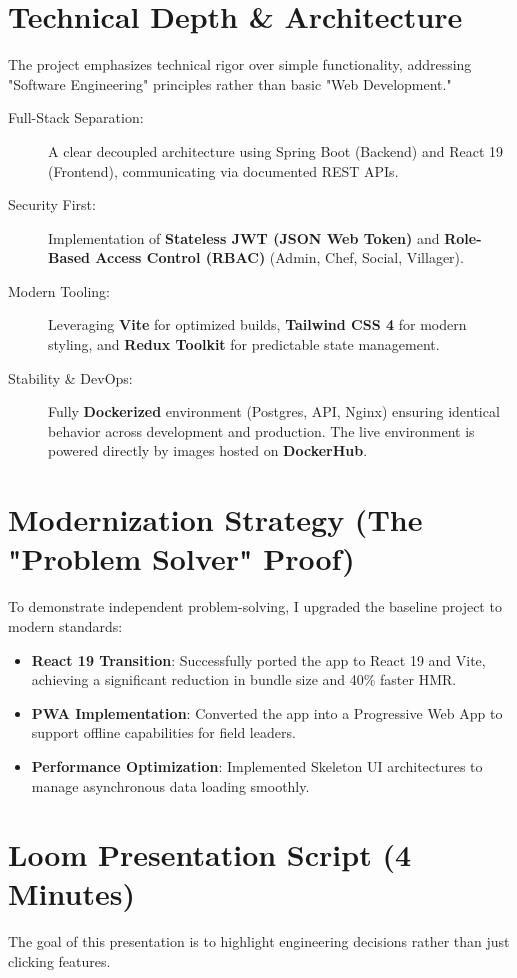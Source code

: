 \documentclass[11pt,a4paper]{article}
\begin{document}
\section{Technical Depth \& Architecture}
The project emphasizes technical rigor over simple functionality, addressing "Software Engineering" principles rather than basic "Web Development."

\begin{description}
    \item[Full-Stack Separation:] A clear decoupled architecture using Spring Boot (Backend) and React 19 (Frontend), communicating via documented REST APIs.
    \item[Security First:] Implementation of \textbf{Stateless JWT (JSON Web Token)} and \textbf{Role-Based Access Control (RBAC)} (Admin, Chef, Social, Villager).
    \item[Modern Tooling:] Leveraging \textbf{Vite} for optimized builds, \textbf{Tailwind CSS 4} for modern styling, and \textbf{Redux Toolkit} for predictable state management.
    \item[Stability \& DevOps:] Fully \textbf{Dockerized} environment (Postgres, API, Nginx) ensuring identical behavior across development and production. The live environment is powered directly by images hosted on \textbf{DockerHub}.
\end{description}

\section{Modernization Strategy (The "Problem Solver" Proof)}
To demonstrate independent problem-solving, I upgraded the baseline project to modern standards:
\begin{itemize}[noitemsep]
    \item \textbf{React 19 Transition}: Successfully ported the app to React 19 and Vite, achieving a significant reduction in bundle size and 40\% faster HMR.
    \item \textbf{PWA Implementation}: Converted the app into a Progressive Web App to support offline capabilities for field leaders.
    \item \textbf{Performance Optimization}: Implemented Skeleton UI architectures to manage asynchronous data loading smoothly.
\end{itemize}

\newpage

\section{Loom Presentation Script (4 Minutes)}
The goal of this presentation is to highlight engineering decisions rather than just clicking features.
\end{document}
